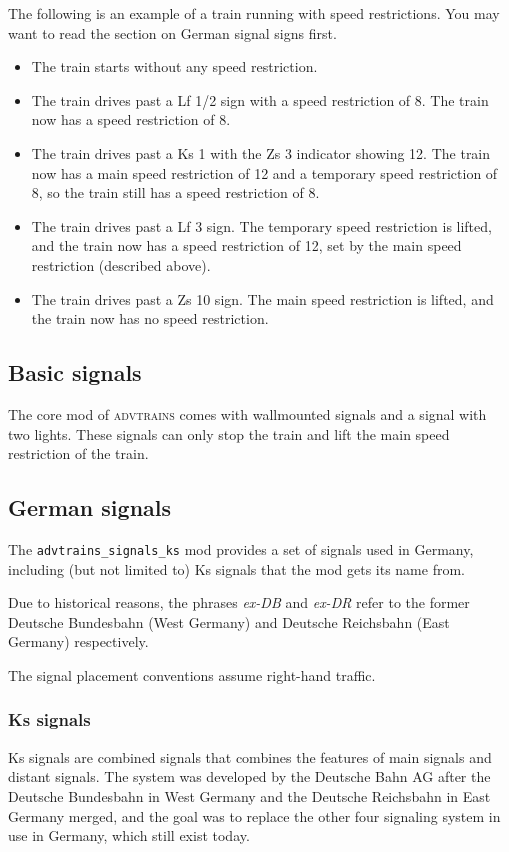 \documentclass[notitlepage]{article}
\def\advtrains{\textsc{advtrains}}
\begin{document}
The following is an example of a train running with speed restrictions. You may want to read the section on German signal signs first.
\begin{itemize}
\item The train starts without any speed restriction.
\item The train drives past a Lf 1/2 sign with a speed restriction of 8. The train now has a speed restriction of 8.
\item The train drives past a Ks 1 with the Zs 3 indicator showing 12. The train now has a main speed restriction of 12 and a temporary speed restriction of 8, so the train still has a speed restriction of 8.
\item The train drives past a Lf 3 sign. The temporary speed restriction is lifted, and the train now has a speed restriction of 12, set by the main speed restriction (described above).
\item The train drives past a Zs 10 sign. The main speed restriction is lifted, and the train now has no speed restriction.
\end{itemize}

\subsection{Basic signals}

The core mod of \advtrains{} comes with wallmounted signals and a signal with two lights. These signals can only stop the train and lift the main speed restriction of the train.

\subsection{German signals}
The \texttt{advtrains\_signals\_ks} mod provides a set of signals used in Germany, including (but not limited to) Ks signals that the mod gets its name from.

Due to historical reasons, the phrases \textit{ex-DB} and \textit{ex-DR} refer to the former Deutsche Bundesbahn (West Germany) and Deutsche Reichsbahn (East Germany) respectively.

The signal placement conventions assume right-hand traffic.

\subsubsection{Ks signals}
Ks signals are combined signals that combines the features of main signals and distant signals. The system was developed by the Deutsche Bahn AG after the Deutsche Bundesbahn in West Germany and the Deutsche Reichsbahn in East Germany merged, and the goal was to replace the other four signaling system in use in Germany, which still exist today.
\end{document}
